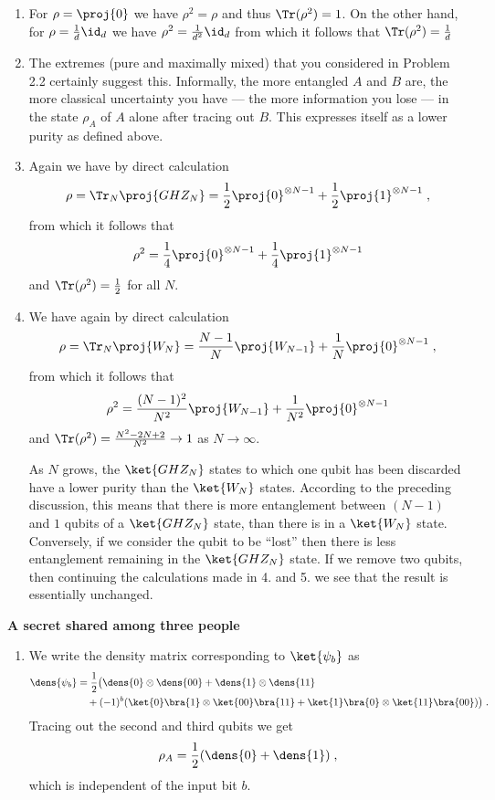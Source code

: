 \begin{exercises}
\begin{enumerate}
	\item For $\rho =\proj{0}$ we have $\rho^2=\rho$ and thus $\Tr(\rho^2)=1$. On the other hand, for $\rho =\frac{1}{d} \id_d$ we have $\rho^2=\frac{1}{d^2} \id_ d$ from which it follows that $\Tr(\rho^2)=\frac{1}{d}$
	
	\item The extremes (pure and maximally mixed) that you considered in Problem 2.2 certainly suggest this. Informally, the more entangled $A$ and $B$ are, the more classical uncertainty you have --- the more information you lose --- in the state $\rho _ A$ of $A$ alone after tracing out $B$. This expresses itself as a lower purity as defined above.
	
	\item Again we have by direct calculation $$\rho = \Tr_ N \proj{GHZ_N} = \frac{1}{2}\proj{0}^{\otimes {N-1}}+\frac{1}{2}\proj{1}^{\otimes {N-1}}\;,$$ from which it follows that $$\rho^2 = \frac{1}{4}\proj{0}^{\otimes {N-1}}+\frac{1}{4}\proj{1}^{\otimes {N-1}}$$ and $\Tr(\rho^2)=\frac{1}{2}$ for all $N$.
	
	\item We have again by direct calculation
	$$\rho = \Tr_N \proj{W_N} = \frac{N-1}{N}\proj{W_{N-1}}+\frac{1}{N}\proj{0}^{\otimes {N-1}}\;,$$ from which it follows that $$\rho ^2 = \frac{(N-1)^2}{N^2}\proj{W_{N-1}}+\frac{1}{N^2}\proj{0}^{\otimes {N-1}}$$ and $\Tr( \rho ^2) = \frac{N^2-2N+2}{N^2} \rightarrow 1$ as $N \rightarrow \infty$.
	
	As $N$ grows, the $\ket{GHZ_N}$ states to which one qubit has been discarded have a lower purity than the $\ket{W_N}$ states. According to the preceding discussion, this means that there is more entanglement between $(N-1)$ and $1$ qubits of a $\ket{GHZ_N}$ state, than there is in a $\ket{W_N}$ state. Conversely, if we consider the qubit to be ``lost'' then there is less entanglement remaining in the $\ket{GHZ_N}$ state. If we remove two qubits, then continuing the calculations made in 4. and 5. we see that the result is essentially unchanged.
\end{enumerate}


\item {\bf A secret shared among three people}
\begin{enumerate}
	\item We write the density matrix corresponding to $\ket{\psi_b}$ as
	\begin{align*}
		\dens{\psi_b} &= \frac{1}{2}\big(\dens{0}\otimes\dens{00} + \dens{1}\otimes\dens{11}\\
		&\quad + (-1)^{b}(\ket{0}\bra{1}\otimes\ket{00}\bra{11} + \ket{1}\bra{0}\otimes\ket{11}\bra{00})\big)\;.
	\end{align*}
	Tracing out the second and third qubits we get \[\rho_A = \frac{1}{2}(\dens{0} + \dens{1})\;,\]	which is independent of the input bit \(b\).
	

\end{enumerate}
\end{exercises}

